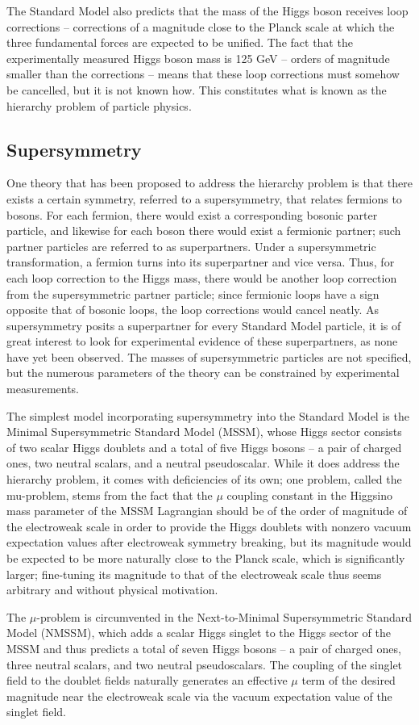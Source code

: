 The Standard Model also predicts that the mass of the Higgs boson receives loop corrections -- corrections of a magnitude close to the Planck scale at which the three fundamental forces are expected to be unified. The fact that the experimentally measured Higgs boson mass is 125 GeV -- orders of magnitude smaller than the corrections -- means that these loop corrections must somehow be cancelled, but it is not known how. This constitutes what is known as the hierarchy problem of particle physics.

\subsection{Supersymmetry}

One theory that has been proposed to address the hierarchy problem is that there exists a certain symmetry, referred to a supersymmetry, that relates fermions to bosons. For each fermion, there would exist a corresponding bosonic parter particle, and likewise for each boson there would exist a fermionic partner; such partner particles are referred to as superpartners. Under a supersymmetric transformation, a fermion turns into its superpartner and vice versa. Thus, for each loop correction to the Higgs mass, there would be another loop correction from the supersymmetric partner particle; since fermionic loops have a sign opposite that of bosonic loops, the loop corrections would cancel neatly.
As supersymmetry posits a superpartner for every Standard Model particle, it is of great interest to look for experimental evidence of these superpartners, as none have yet been observed. The masses of supersymmetric particles are not specified, but the numerous parameters of the theory can be constrained by experimental measurements.

The simplest model incorporating supersymmetry into the Standard Model is the Minimal Supersymmetric Standard Model (MSSM), whose Higgs sector consists of two scalar Higgs doublets and a total of five Higgs bosons -- a pair of charged ones, two neutral scalars, and a neutral pseudoscalar. While it does address the hierarchy problem, it comes with deficiencies of its own; one problem, called the mu-problem, stems from the fact that the $\mu$ coupling constant in the Higgsino mass parameter of the MSSM Lagrangian should be of the order of magnitude of the electroweak scale in order to provide the Higgs doublets with nonzero vacuum expectation values after electroweak symmetry breaking, but its magnitude would be expected to be more naturally close to the Planck scale, which is significantly larger; fine-tuning its magnitude to that of the electroweak scale thus seems arbitrary and without physical motivation.

The $\mu$-problem is circumvented in the Next-to-Minimal Supersymmetric Standard Model (NMSSM), which adds a scalar Higgs singlet to the Higgs sector of the MSSM and thus predicts a total of seven Higgs bosons -- a pair of charged ones, three neutral scalars, and two neutral pseudoscalars. The coupling of the singlet field to the doublet fields naturally generates an effective $\mu$ term of the desired magnitude near the electroweak scale via the vacuum expectation value of the singlet field.